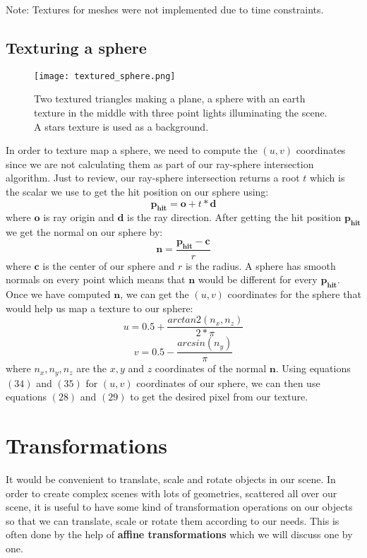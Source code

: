 \documentclass[11pt,a4paper]{article}
\begin{document}
	\noindent
	Note: Textures for meshes were not implemented due to time constraints.
	
	\subsection{Texturing a sphere}
	\begingroup
	\setlength{\intextsep}{5pt}
	\setlength{\columnsep}{35pt}
	\begin{wrapfigure}{r}{0.45\textwidth}
		\centering
		\texttt{[image: textured\_sphere.png]}
		\caption{Two textured triangles making a plane, a sphere with an earth texture in the middle with three point lights illuminating the scene. A stars texture is used as a background.}\label{fig:textured_sphere}
	\end{wrapfigure}
	In order to texture map a sphere, we need to compute the $(u, v)$ coordinates since we are not calculating them as part of our ray-sphere intersection algorithm. Just to review, our ray-sphere intersection returns a root $t$ which is the scalar we use to get the hit position on our sphere using:
	\begin{equation}
		\boldsymbol{p_{hit}} = \boldsymbol{o} + t*\boldsymbol{d} 
	\end{equation}
	where $\boldsymbol{o}$ is ray origin and $\boldsymbol{d}$ is the ray direction. After getting the hit position $\boldsymbol{p_{hit}}$ we get the normal on our sphere by:
	\begin{equation}
		\boldsymbol{{n}} = \frac{\boldsymbol{p_{hit}} - \boldsymbol{c}}{r}
	\end{equation}
	where $\boldsymbol{c}$ is the center of our sphere and $r$ is the radius. A sphere has smooth normals on every point which means that $\boldsymbol{n}$ would be different for every $\boldsymbol{p_{hit}}$. Once we have computed $\boldsymbol{n}$, we can get the $(u, v)$ coordinates for the sphere that would help us map a texture to our sphere:
	\begin{equation}
		u = 0.5 + \frac{arctan2(n_{x}, n_{z})}{2 * \pi}
	\end{equation}
	\begin{equation}
		v = 0.5 - \frac{arcsin(n_{y})}{\pi}
	\end{equation}
	where $n_{x}, n_{y}, n_{z}$ are the $x, y$ and $z$ coordinates of the normal $\boldsymbol{n}$. Using equations $(34)$ and $(35)$ for $(u, v)$ coordinates of our sphere, we can then use equations $(28)$ and $(29)$ to get the desired pixel from our texture.
	\endgroup
	\section{Transformations}
	It would be convenient to translate, scale and rotate objects in our scene. In order to create complex scenes with lots of geometries, scattered all over our scene, it is useful to have some kind of transformation operations on our objects so that we can translate, scale or rotate them according to our needs. This is often done by the help of \textbf{affine transformations} which we will discuss one by one.
\end{document}
